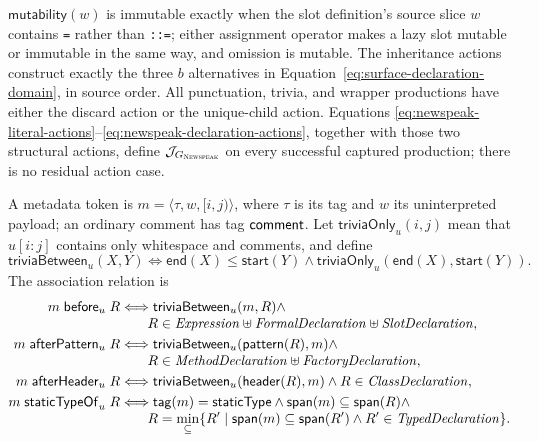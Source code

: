 $\mathsf{mutability}(w)$ is immutable exactly when the slot definition's
source slice $w$ contains \texttt{=} rather than \texttt{::=}; either
assignment operator makes a lazy slot mutable or immutable in the same way,
and omission is mutable.
The inheritance actions construct exactly the three $b$ alternatives in
Equation~\eqref{eq:surface-declaration-domain}, in source order.  All
punctuation, trivia, and wrapper productions have either
the discard action or the unique-child action.  Equations
\eqref{eq:newspeak-literal-actions}--\eqref{eq:newspeak-declaration-actions},
together with those two structural actions, define $\mathcal J_{G_{\textsc{Newspeak}}}$ on
every successful captured production; there is no residual action case.

A metadata token is $m=\langle\tau,w,[i,j)\rangle$, where $\tau$ is its tag
and $w$ its uninterpreted payload; an ordinary comment has tag $\mathsf{comment}$.
Let $\mathsf{triviaOnly}_{u}(i,j)$ mean that $u[i:j]$ contains only whitespace
and comments, and define
\begin{equation}\label{eq:metadata-trivia-gap}
 \mathsf{triviaBetween}_{u}(X,Y)\Longleftrightarrow
 \mathsf{end}(X)\le\mathsf{start}(Y)\land
 \mathsf{triviaOnly}_{u}(\mathsf{end}(X),\mathsf{start}(Y)).
\end{equation}
The association relation is
\begin{equation}\label{eq:metadata-association}
\begin{aligned}
 m\mathrel{\mathsf{before}_{u}}R
 &\Longleftrightarrow
   \mathsf{triviaBetween}_{u}(m,R)\land\\[-1mm]
 &\qquad R\in\mathit{Expression}\uplus\mathit{FormalDeclaration}
                    \uplus\mathit{SlotDeclaration},\\
 m\mathrel{\mathsf{afterPattern}_{u}}R
 &\Longleftrightarrow
   \mathsf{triviaBetween}_{u}(\mathsf{pattern}(R),m)\land\\[-1mm]
 &\qquad R\in\mathit{MethodDeclaration}
                   \uplus\mathit{FactoryDeclaration},\\
 m\mathrel{\mathsf{afterHeader}_{u}}R
 &\Longleftrightarrow
   \mathsf{triviaBetween}_{u}(\mathsf{header}(R),m)\land
   R\in\mathit{ClassDeclaration},\\
 m\mathrel{\mathsf{staticTypeOf}_{u}}R
 &\Longleftrightarrow
   \mathsf{tag}(m)=\mathsf{staticType}\land
   \mathsf{span}(m)\subseteq\mathsf{span}(R)\land\\[-1mm]
 &\qquad R=\min_{\subseteq}\{R'\mid
      \mathsf{span}(m)\subseteq\mathsf{span}(R')\land
      R'\in\mathit{TypedDeclaration}\}.
\end{aligned}
\end{equation}
